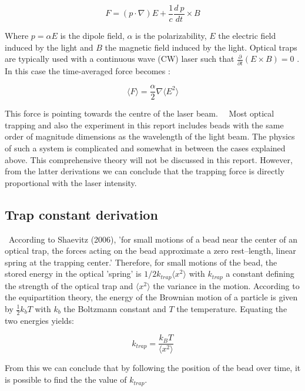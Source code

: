 \begin{equation}
	F  =  (p \cdot \nabla)E + \frac{1}{c} \frac{d \: p}{dt} \times B
\end{equation}

Where $ p = \alpha E $ is the dipole field, $\alpha $ is the polarizability, $E$ the electric field induced by the light and $B$ the magnetic field induced by the light. Optical traps are typically used with a continuous wave (CW) laser such that $ \frac{\partial}{\partial t}(E \times B) = 0 $ . In this case the time-averaged force becomes \cite{shaevitz}:

\begin{equation}
	\big \langle F \big \rangle  = \frac{ \alpha }{2} \nabla \big \langle E^2 \big \rangle
\end{equation}

This force is pointing towards the centre of the laser beam. \
\ 
Most optical trapping and also the experiment in this report includes beads with the same order of magnitude dimensions as the wavelength of the light beam. The physics of such a system is complicated and somewhat in between the cases explained above. This comprehensive theory will not be discussed in this report. However, from the latter derivations we can conclude that the trapping force is directly proportional with the laser intensity. \

\subsection{Trap constant derivation}
\label{trap_constant}
\
According to Shaevitz (2006), 'for small motions of a bead near the center of an optical trap, the forces acting on the bead approximate a zero rest–length, linear spring at the trapping center.' Therefore, for small motions of the bead, the stored energy in the optical 'spring' is $1/2 k_{trap} \langle x^2 \rangle $ with $k_{trap}$ a constant defining the strength of the optical trap and $ \langle x^2 \rangle $ the variance in the motion. According to the equipartition theory, the energy of the Brownian motion of a particle is given by $\frac{1}{2} k_b T $ with $ k_b $ the Boltzmann constant and $T$ the temperature.\cite{shaevitz} Equating the two energies yields:

\begin{equation} 
	\label{eq_k_trap}
	k_{trap} = \frac{k_B T}{ \langle x^2 \rangle}
\end{equation}

From this we can conclude that by following the position of the bead over time, it is possible to find the the value of $k_{trap}$. \

